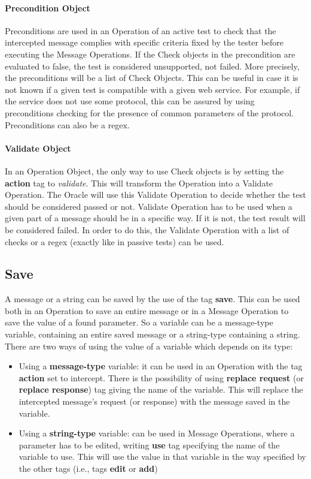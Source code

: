 \paragraph{Precondition Object}
Preconditions are used in an Operation of an active test to check that the intercepted message complies with specific criteria fixed by the tester before executing the Message Operations. If the Check objects in the precondition are evaluated to false, the test is considered unsupported, not failed. More precisely, the preconditions will be a list of Check Objects. This can be useful in case it is not known if a given test is compatible with a given web service. For example, if the service does not use some protocol, this can be assured by using preconditions checking for the presence of common parameters of the protocol. Preconditions can also be a regex.
\paragraph{Validate Object}
In an Operation Object, the only way to use Check objects is by setting the \textbf{action} tag to \textit{validate}. This will transform the Operation into a Validate Operation. The Oracle will use this Validate Operation to decide whether the test should be considered passed or not. Validate Operation has to be used when a given part of a message should be in a specific way. If it is not, the test result will be considered failed.
In order to do this, the Validate Operation with a list of checks or a regex (exactly like in passive tests) can be used.

\subsection{Save}
A message or a string can be saved by the use of the tag \textbf{save}. This can be used both in an Operation to save an entire message or in a Message Operation to save the value of a found parameter. So a variable can be a message-type variable, containing an entire saved message or a string-type containing a string.
There are two ways of using the value of a variable which depends on its type:
\begin{itemize}
    \item Using a \textbf{message-type} variable: it can be used in an Operation with the tag \textbf{action} set to intercept. There is the possibility of using \textbf{replace request} (or \textbf{replace response}) tag giving the name of the variable. This will replace the intercepted message's request (or response) with the message saved in the variable.
    \item Using a \textbf{string-type} variable: can be used in Message Operations, where a parameter has to be edited, writing \textbf{use} tag specifying the name of the variable to use. This will use the value in that variable in the way specified by the other tags (i.e., tags \textbf{edit} or \textbf{add})
\end{itemize}

